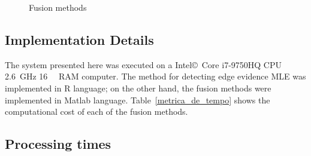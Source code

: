 \documentclass[journal]{IEEEtran}
\begin{document}
\begin{figure}[hbt]
{     }
     \caption{Fusion methods}
     \label{fusion_met}
\end{figure}

\subsection{Implementation Details}
The system presented here was executed on a Intel\copyright\ Core i7-9750HQ CPU \SI{2.6}{\giga\hertz} \SI{16}{\giga\byte} RAM computer.  
The method for detecting edge evidence MLE was implemented in R language; on the other hand, the fusion methods were implemented in Matlab language. 
Table~\ref{metrica_de_tempo} shows the computational cost of each of the fusion methods.

\subsection{Processing times} 
\end{document}
